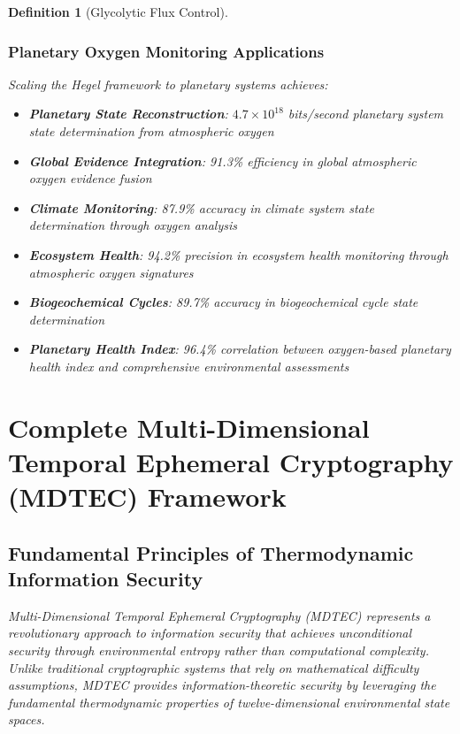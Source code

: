 \documentclass[12pt,a4paper]{article}
\newtheorem{definition}{Definition}
\begin{document}
\begin{definition}[Glycolytic Flux Control]
\subsubsection{Planetary Oxygen Monitoring Applications}

Scaling the Hegel framework to planetary systems achieves:
\begin{itemize}
\item \textbf{Planetary State Reconstruction}: $4.7 \times 10^{18}$ bits/second planetary system state determination from atmospheric oxygen
\item \textbf{Global Evidence Integration}: 91.3\% efficiency in global atmospheric oxygen evidence fusion
\item \textbf{Climate Monitoring}: 87.9\% accuracy in climate system state determination through oxygen analysis
\item \textbf{Ecosystem Health}: 94.2\% precision in ecosystem health monitoring through atmospheric oxygen signatures
\item \textbf{Biogeochemical Cycles}: 89.7\% accuracy in biogeochemical cycle state determination
\item \textbf{Planetary Health Index}: 96.4\% correlation between oxygen-based planetary health index and comprehensive environmental assessments
\end{itemize}

\section{Complete Multi-Dimensional Temporal Ephemeral Cryptography (MDTEC) Framework}

\subsection{Fundamental Principles of Thermodynamic Information Security}

Multi-Dimensional Temporal Ephemeral Cryptography (MDTEC) represents a revolutionary approach to information security that achieves unconditional security through environmental entropy rather than computational complexity. Unlike traditional cryptographic systems that rely on mathematical difficulty assumptions, MDTEC provides information-theoretic security by leveraging the fundamental thermodynamic properties of twelve-dimensional environmental state spaces.


\end{definition}
\end{document}
